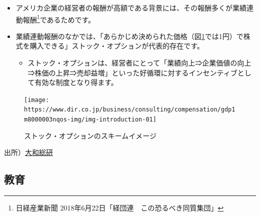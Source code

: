 \documentclass[
]{book}
\providecommand{\tightlist}{%
  \setlength{\itemsep}{0pt}\setlength{\parskip}{0pt}}
\begin{document}
\begin{itemize}
\tightlist
\item
  アメリカ企業の経営者の報酬が高額である背景には、その報酬多くが業績連動報酬\footnote{日経産業新聞 2018年6月22日「経団連　この恐るべき同質集団」}であるためです。
\end{itemize}

\begin{itemize}
\item
  業績連動報酬のなかでは、「あらかじめ決められた価格（図\ref{fig:stockoption}では1円）で株式を購入できる」ストック・オプションが代表的存在です。

  \begin{itemize}
  \tightlist
  \item
    ストック・オプションは、経営者にとって「業績向上⇒企業価値の向上⇒株価の上昇⇒売却益増」といった好循環に対するインセンティブとして有効な制度となり得ます。
  \end{itemize}
\end{itemize}

\begin{figure}
\texttt{[image: https://www.dir.co.jp/business/consulting/compensation/gdp1m8000003nqos-img/img-introduction-01]} \caption{ストック・オプションのスキームイメージ}\label{fig:stockoption}
\end{figure}

出所）\href{https://www.dir.co.jp/business/consulting/compensation/stock-option.html}{大和総研}

\hypertarget{us-education}{%
\subsection{教育}\label{us-education}}
\end{document}
